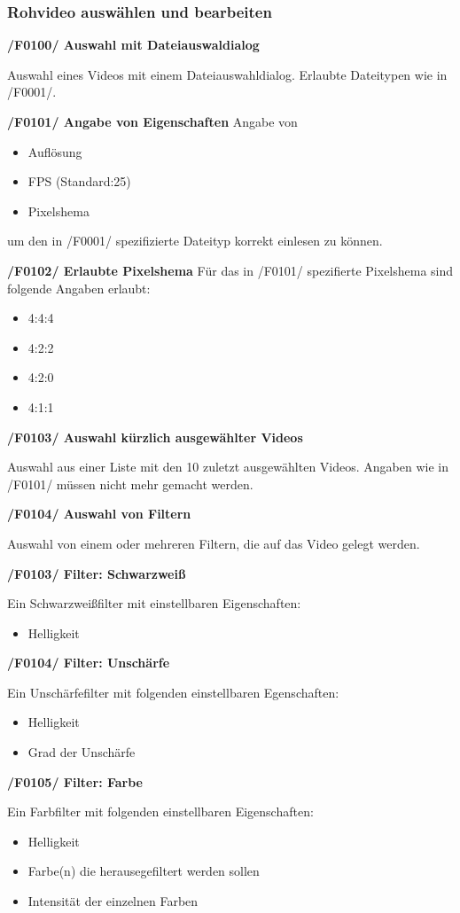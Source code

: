 \documentclass[parskip=full]{scrartcl}
\begin{document}
\subsubsection{Rohvideo auswählen und bearbeiten}
\textbf{/F0100/ Auswahl mit Dateiauswaldialog}

Auswahl eines Videos mit einem Dateiauswahldialog. Erlaubte Dateitypen wie in /F0001/.

\textbf{/F0101/ Angabe von Eigenschaften}
Angabe von
\begin{itemize}
\item Auflösung
\item FPS (Standard:25)
\item Pixelshema
\end{itemize}
um den in /F0001/ spezifizierte Dateityp korrekt einlesen zu können.

\textbf{/F0102/ Erlaubte Pixelshema}
Für das in /F0101/ spezifierte Pixelshema sind folgende Angaben erlaubt:
\begin{itemize}
\item 4:4:4
\item 4:2:2
\item 4:2:0
\item 4:1:1
\end{itemize}

\textbf{/F0103/ Auswahl kürzlich ausgewählter Videos}

Auswahl aus einer Liste mit den 10 zuletzt ausgewählten Videos. Angaben wie in /F0101/ müssen
nicht mehr gemacht werden.

\textbf{/F0104/ Auswahl von Filtern}

Auswahl von einem oder mehreren Filtern, die auf das Video gelegt werden.

\textbf{/F0103/ Filter: Schwarzweiß}

Ein Schwarzweißfilter mit einstellbaren Eigenschaften:
\begin{itemize}
\item Helligkeit
\end{itemize}
\newpage
\textbf{/F0104/ Filter: Unschärfe}

Ein Unschärfefilter mit folgenden einstellbaren Egenschaften:
\begin{itemize}
\item Helligkeit
\item Grad der Unschärfe
\end{itemize}

\textbf{/F0105/ Filter: Farbe}

Ein Farbfilter mit folgenden einstellbaren Eigenschaften:
\begin{itemize}
\item Helligkeit
\item Farbe(n) die herausegefiltert werden sollen
\item Intensität der einzelnen Farben
\end{itemize}
\end{document}
